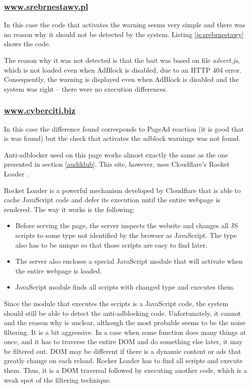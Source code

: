 \subsubsection{\url{www.srebrnestawy.pl}}
In this case the code that activates the warning seems very simple and there was no reason why
it should not be detected by the system. Listing \ref{js:srebrnestawy} shows the code.



The reason why it was not detected is that the bait was based on file \emph{advert.js}, which is not loaded 
even when AdBlock is disabled, due to an HTTP 404 error. Consequently, the warning is displayed even 
when AdBlock is disabled and the system was right -- there were no execution differences.

\subsubsection{\url{www.cyberciti.biz}}
In this case the difference found corresponds to PageAd reaction (it is good that is was found)
but the check that activates the adblock warnings was not found.

Anti-adblocker used on this page works almost exactly the same as the one presented in section \ref{audiklub}.
This site, however, uses Cloudflare's Rocket Loader \cite{cloud-flare:rocket-loader}.

Rocket Loader is a powerful mechanism developed by Cloudflare that is able to cache JavaScript code and defer its execution 
until the entire webpage is rendered. The way it works is the following: 
\begin{itemize}
  \item  Before serving the page, the server inspects the website and changes all JS scripts 
            to some type not identified by the browser as JavaScript. 
            The type also has  to be unique so that those scripts are easy to find later.
  \item The server also encloses a special JavaScript module that will activate when the entire webpage is loaded.
  \item JavaScript module finds all scripts with changed type and executes them.
\end{itemize}

Since the module that executes the scripts is a JavaScript code, the system should still be able
to detect the anti-adblocking code. Unfortunately, it cannot and the reason why is unclear, although 
the most probable seems to be the noise filtering. It is a bit aggressive. In a case when some function
does many things at once, and it has to traverse the entire DOM and do something else later, 
it may be filtered out. DOM may be different if there is a dynamic content 
or ads that greatly change on each reload.
Rocker Loader has to find all scripts and execute them. Thus, it is a DOM traversal followed by executing
another code, which is a weak spot of the filtering technique.

